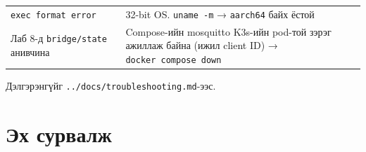 \begin{longtable}[]{@{}ll@{}}
\begin{minipage}[t]{0.47\columnwidth}
\texttt{exec\ format\ error}\strut
\end{minipage} & \begin{minipage}[t]{0.47\columnwidth}\raggedright
32-bit OS. \texttt{uname\ -m} → \texttt{aarch64} байх ёстой\strut
\end{minipage}\tabularnewline
\begin{minipage}[t]{0.47\columnwidth}\raggedright
Лаб 8-д \texttt{bridge/state} анивчина\strut
\end{minipage} & \begin{minipage}[t]{0.47\columnwidth}\raggedright
Compose-ийн mosquitto K3s-ийн pod-той зэрэг ажиллаж байна (ижил client ID) → \texttt{docker\ compose\ down}\strut
\end{minipage}\tabularnewline
\bottomrule
\end{longtable}\endgroup

Дэлгэрэнгүйг \texttt{.\allowbreak{}.\allowbreak{}/\allowbreak{}docs/\allowbreak{}troubleshooting.\allowbreak{}md}-ээс.

\hypertarget{ux44dux445-ux441ux443ux440ux432ux430ux43bux436}{%
\section{Эх сурвалж}\label{ux44dux445-ux441ux443ux440ux432ux430ux43bux436}}

